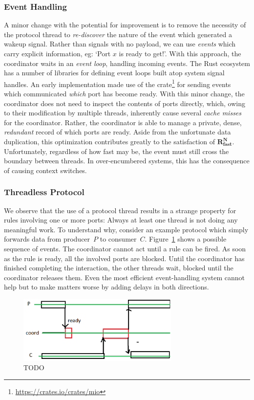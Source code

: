 \subsubsection{Event Handling}
A minor change with the potential for improvement is to remove the necessity of the protocol thread to \textit{re-discover} the nature of the event which generated a wakeup signal. Rather than signals with no payload, we can use \textit{events} which carry explicit information, eg: `Port $x$ is ready to get!'. With this approach, the coordinator waits in an \textit{event loop}, handling incoming events. The Rust ecosystem has a number of libraries for defining event loops built atop system signal handles. An early implementation made use of the  crate\footnote{\url{https://crates.io/crates/mio}} for sending events which communicated \textit{which} port has become ready. With this minor change, the coordinator does not need to inspect the contents of ports directly, which, owing to their modification by multiple threads, inherently cause several \textit{cache misses} for the coordinator. Rather, the coordinator is able to manage a private, dense, \textit{redundant} record of which ports are ready. Aside from the unfortunate data duplication, this optimization contributes greatly to the satisfaction of $\boldsymbol{R^N_{fast}}$. Unfortunately, regardless of how fast  may be, the event must still cross the boundary between threads. In over-encumbered systems, this has the consequence of causing context switches.

\subsubsection{Threadless Protocol}
We observe that the use of a protocol thread results in a strange property for rules involving one or more ports: Always at least one thread is not doing any meaningful work. To understand why, consider an example protocol which simply forwards data from producer~$P$ to consumer~$C$. Figure~\ref{fig:sequence_diag} shows a possible sequence of events. The coordinator cannot act until a rule can be fired. As soon as the rule is ready, all the involved ports are blocked. Until the coordinator has finished completing the interaction, the other threads wait, blocked until the coordinator releases them. Even the most efficient event-handling system cannot help but to make matters worse by adding delays in both directions.

\begin{figure}[t]
	\centering
	\includegraphics[width=8cm]{sequence.png}
	\caption[TODO]{TODO}
	\label{fig:sequence_diag}
\end{figure}

